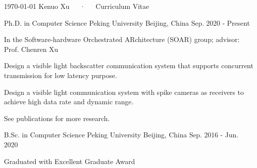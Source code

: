 \documentclass[11pt, a4paper]{awesome-cv}
\begin{document}
\makecvheader

\makecvfooter
  {\today}
  {Kenuo Xu~~~·~~~Curriculum Vitae}
  {\thepage}



\begin{cventries}
	
	\cventry
	{Ph.D. in Computer Science}
	{Peking University}
	{Beijing, China}
	{Sep. 2020 - Present}
	{
		\begin{cvitems} %
			\item {In the Software-hardware Orchestrated ARchitecture (SOAR) group; advisor: Prof. Chenren Xu}
			\item {Design a visible light backscatter communication system that supports concurrent transmission for low latency purpose.}
			\item {Design a visible light communication system with spike cameras as receivers to achieve high data rate and dynamic range.}
			\item {See publications for more research.}
		\end{cvitems}
	}

	\cventry
	{B.Sc. in Computer Science} %
	{Peking University} %
	{Beijing, China} %
	{Sep. 2016 - Jun. 2020} %
	{
		\begin{cvitems} %
			\item {Graduated with Excellent Graduate Award}
		\end{cvitems}
	}

\end{cventries}
\end{document}
